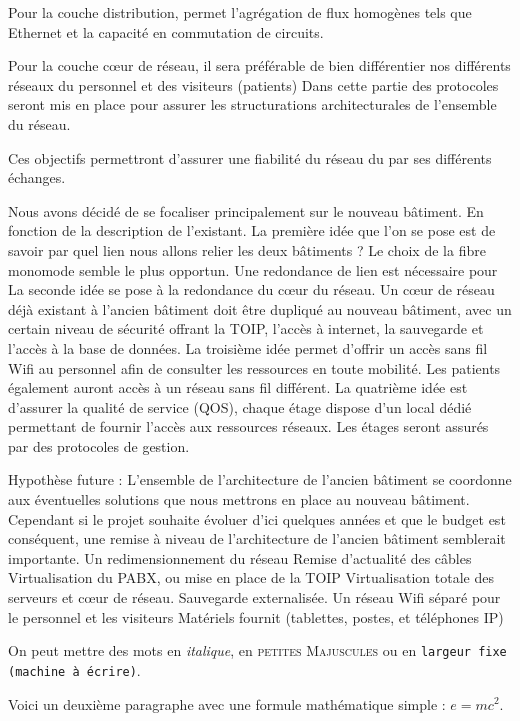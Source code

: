 Pour la couche distribution, permet l’agrégation de flux homogènes tels que Ethernet et la capacité en commutation de circuits.

Pour la couche cœur de réseau, il sera préférable de bien différentier nos différents réseaux du personnel et des visiteurs (patients)
Dans cette partie des protocoles seront mis en place pour assurer les structurations architecturales de l’ensemble du réseau.

Ces objectifs permettront d’assurer une fiabilité du réseau du par ses différents échanges.


Nous avons décidé de se focaliser principalement sur le nouveau bâtiment. En fonction de la description de l’existant.
La première idée que l’on se pose est de savoir par quel lien nous allons relier les deux bâtiments ? Le choix de la fibre monomode semble le plus opportun. Une redondance de lien est nécessaire pour
La seconde idée se pose à la redondance du cœur du réseau. Un cœur de réseau déjà existant à l’ancien bâtiment doit être dupliqué au nouveau bâtiment, avec un certain niveau de sécurité offrant la TOIP, l’accès à internet, la sauvegarde et l’accès à la base de données.
La troisième idée permet d’offrir un accès sans fil Wifi au personnel afin de consulter les ressources en toute mobilité. Les patients également auront accès à un réseau sans fil différent.
La quatrième idée est d’assurer la qualité de service (QOS), chaque étage dispose d’un local dédié permettant de fournir l’accès aux ressources réseaux. Les étages seront assurés par des protocoles de gestion.

Hypothèse future :
L’ensemble de l’architecture de l’ancien bâtiment se coordonne aux éventuelles solutions que nous mettrons en place au nouveau bâtiment. Cependant si le projet souhaite évoluer d’ici quelques années et que le budget est conséquent, une remise à niveau de l’architecture de l’ancien bâtiment semblerait importante.
Un redimensionnement du réseau
Remise d’actualité des câbles
Virtualisation du PABX, ou mise en place de la TOIP
Virtualisation totale des serveurs et cœur de réseau.
Sauvegarde externalisée.
Un réseau Wifi séparé pour le personnel et les visiteurs
Matériels fournit (tablettes, postes, et téléphones IP)



On peut mettre des mots en \emph{italique},
en \textsc{petites Majuscules} ou
en \texttt{largeur fixe (machine à écrire)}.

Voici un deuxième paragraphe avec une formule mathématique simple : $e = mc^2$.

